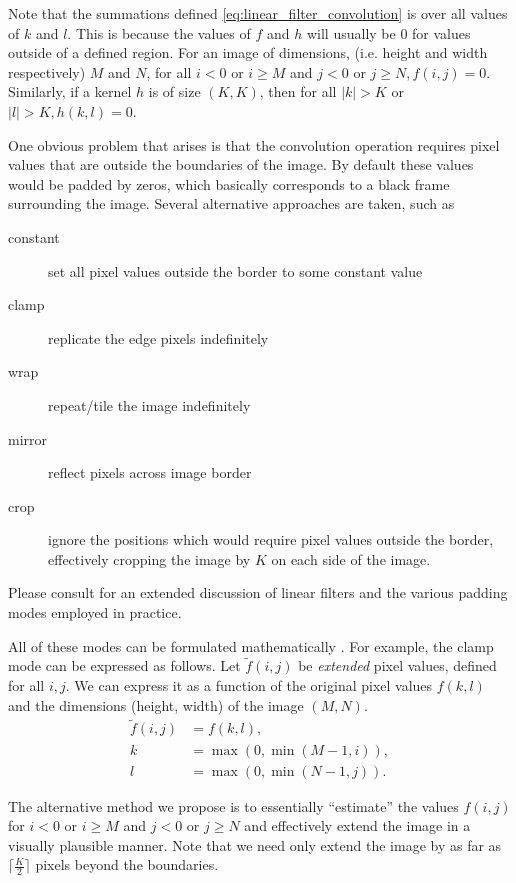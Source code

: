 \documentclass[11pt,oneside]{book}
\theoremstyle{plain}
\theoremstyle{definition}
\theoremstyle{remark}
\begin{document}
Note that the summations defined \cref{eq:linear_filter_convolution} is over
all values of $k$ and $l$. This is because the values of $f$ and $h$ will usually
be 0 for values outside of a defined region. For an image of dimensions, (i.e.
height and width respectively) $M$ and $N$, for all $i<0$ or $i \geq M$ and $j<0$ 
or $j \geq N, f(i,j)=0$. Similarly, if a kernel $h$ is of size $(K, K)$, then for
all $|k|>K$ or $|l|>K, h(k,l)=0$.  

One obvious problem that arises is that the convolution operation requires 
pixel values that are outside the boundaries of the image. By default these
values would be padded by zeros, which basically corresponds to a black frame
surrounding the image. Several alternative approaches are taken, such 
as

\begin{description}
  \item[constant] set all pixel values outside the border to some constant value
  \item[clamp] replicate the edge pixels indefinitely
  \item[wrap] repeat/tile the image indefinitely
  \item[mirror] reflect pixels across image border
  \item[crop] ignore the positions which would require pixel values outside the border,
    effectively cropping the image by $K$ on each side of the image.
\end{description}

Please consult \citet[p.~111-115]{Szeliski2011} for an extended discussion
of linear filters and the various padding modes employed in practice. 

All of these modes can be formulated mathematically 
\cite[see][p.~114-115]{Szeliski2011}. For example, the clamp mode can be expressed 
as follows. Let $\tilde{f}(i, j)$ be \emph{extended} pixel values, defined for all 
$i, j$. We can express it as a function of the original pixel values $f(k, l)$ and the 
dimensions (height, width) of the image $(M, N)$.
\begin{align*}
  \tilde{f}(i, j) &= f(k, l), \\
  k               &= \max(0, \min(M-1, i)), \\
  l               &= \max(0, \min(N-1, j)).
\end{align*}

The alternative method we propose is to essentially ``estimate'' the values $f(i,j)$
for $i<0$ or $i \geq M$ and $j<0$ or $j \geq N$ and effectively extend the image in 
a visually plausible manner. Note that we need only extend the image by as far
as $\lceil \frac{K}{2} \rceil$ pixels beyond the boundaries.
\end{document}
